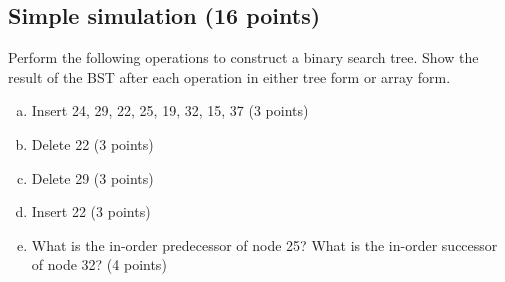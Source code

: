 \documentclass[11pt]{exam}
\begin{document}
\subsection{Simple simulation (16 points)}

Perform the following operations to construct a binary search tree. Show the result of the BST after each operation in either tree form or array form.

\begin{enumerate}[a)]
\item Insert 24, 29, 22, 25, 19, 32, 15, 37 (3 points)
\begin{solution}
\end{solution}

\item Delete 22 (3 points)
\begin{solution}
\end{solution}

\item Delete 29 (3 points)
\begin{solution}
\end{solution}

\item Insert 22 (3 points)
\begin{solution}
\end{solution}

\item What is the in-order predecessor of node 25? What is the in-order successor of node 32? (4 points)
\begin{solution}
\end{solution}


\end{enumerate}
\end{document}
